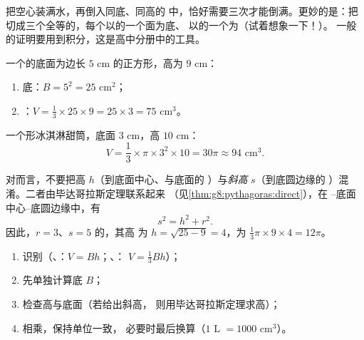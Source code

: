 \begin{remark}[为什么是三分之一？]
把空心装满水，再倒入同底、同高的
中，恰好需要三次才能倒满。更妙的是：把
切成三个全等的，每个以的一个面为底、
以的一个为（试着想象一下！）。
一般的证明要用到积分，这是高中分册中的工具。
\end{remark}

\begin{example}\label{ex:g8:solids:volume}
一个的底面为边长 $5$ cm 的正方形，高为 $9$ cm：
\begin{enumerate}
  \item 底：$B = 5^2 = 25$ cm$^2$；
  \item {}：$V = \frac13 \times 25 \times 9 = 25 \times 3 = 75$
        cm$^3$。
\end{enumerate}
一个形冰淇淋甜筒，底面 $3$ cm，高 $10$ cm：
\[
V = \frac13 \times \pi \times 3^2 \times 10 = 30\pi \approx 94
\text{ cm}^3 .
\]
\end{example}

\begin{example}[注意区分高]\label{ex:g8:solids:slant}
对而言，不要把高 $h$（到底面中心、与底面的
）与\emph{斜高} $s$（到底圆边缘的
）混淆。二者由毕达哥拉斯定理联系起来
（见\cref{thm:g8:pythagoras:direct}），在
–底面中心–底圆边缘中，有
\[
s^2 = h^2 + r^2 .
\]
因此，$r = 3$、$s = 5$ 的，其高
为 $h = \sqrt{25 - 9} = 4$，为
$\frac13 \pi \times 9 \times 4 = 12\pi$。
\end{example}

\begin{method}[体积问题]\label{met:g8:solids:method}
\begin{enumerate}
  \item 识别（、：$V = Bh$；、：
        $V = \frac13 Bh$）；
  \item 先单独计算底 $B$；
  \item 检查高与底面（若给出斜高，
        则用毕达哥拉斯定理求高）；
  \item 相乘，保持单位一致，
        必要时最后换算（$1$ L $= 1000$ cm$^3$）。
\end{enumerate}
\end{method}

